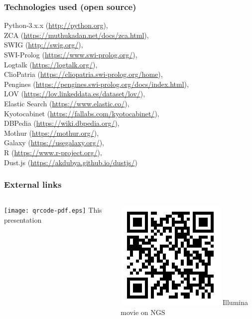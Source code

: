 \documentclass[10pt]{beamer}
\begin{document}
\begin{frame}
  \frametitle{Technologies used (open source)}
  Python-3.x.x (\url{http://python.org}),\\
  ZCA (\url{https://muthukadan.net/docs/zca.html}),\\
  SWIG (\url{http://swig.org/}),\\
  SWI-Prolog (\url{https://www.swi-prolog.org/}),\\
  Logtalk (\url{https://logtalk.org/}),\\
  ClioPatria (\url{https://cliopatria.swi-prolog.org/home}),\\
  Pengines (\url{https://pengines.swi-prolog.org/docs/index.html}),\\
  LOV (\url{https://lov.linkeddata.es/dataset/lov/}),\\
  Elastic Search (\url{https://www.elastic.co/}),\\
  Kyotocabinet (\url{https://fallabs.com/kyotocabinet/}),\\
  DBPedia (\url{https://wiki.dbpedia.org/}),\\
  Mothur (\url{https://mothur.org/}),\\
  Galaxy (\url{https://usegalaxy.org/}),\\
  R (\url{https://www.r-project.org/}), \\
  Dust.js (\url{https://akdubya.github.io/dustjs/})
\end{frame}

\begin{frame}
  \frametitle{External links}
  \begin{columns}
    \begin{column}{0.5\textwidth}\centering
      \texttt{[image: qrcode-pdf.eps]}
      This presentation
    \end{column}
    \begin{column}{0.5\textwidth}\centering
      \includegraphics[width=0.95\linewidth]{qr-illumina.png}
      Illumina movie on NGS
    \end{column}
  \end{columns}
\end{frame}
\end{document}
